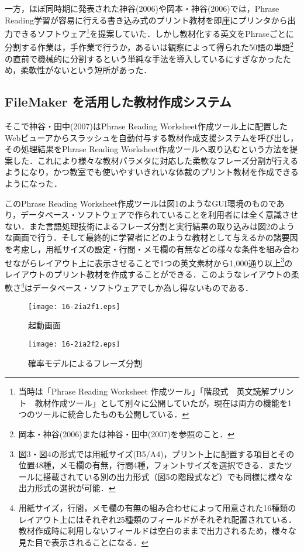 \documentclass[japanese]{jnlp_1.4}
\begin{document}
一方，ほぼ同時期に発表された神谷(2006)や岡本・神谷(2006)では，Phrase Reading学習が容易に行える書き込み式のプリント教材を即座にプリンタから出力できるソフトウェア\footnote{当時は「Phrase Reading Worksheet 作成ツール」「階段式　英文読解プリント　教材作成ツール」として別々に公開していたが，現在は両方の機能を1つのツールに統合したものも公開している．}を提案していた．しかし教材化する英文をPhraseごとに分割する作業は，手作業で行うか，あるいは観察によって得られた50語の単語\footnote{岡本・神谷(2006)または神谷・田中(2007)を参照のこと．}の直前で機械的に分割するという単純な手法を導入しているにすぎなかったため，柔軟性がないという短所があった．


\subsection{FileMaker を活用した教材作成システム}

そこで神谷・田中(2007)はPhrase Reading Worksheet作成ツール上に配置したWebビューアからスラッシュを自動付与する教材作成支援システムを呼び出し，その処理結果をPhrase Reading Worksheet作成ツールへ取り込むという方法を提案した．これにより様々な教材パラメタに対応した柔軟なフレーズ分割が行えるようになり，かつ教室でも使いやすいきれいな体裁のプリント教材を作成できるようになった．

このPhrase Reading Worksheet作成ツールは図1のようなGUI環境のものであり，データベース・ソフトウェアで作られていることを利用者には全く意識させない．また言語処理技術によるフレーズ分割と実行結果の取り込みは図2のような画面で行う．そして最終的に学習者にどのような教材として与えるかの諸要因を考慮し，用紙サイズの設定・行間・メモ欄の有無などの様々な条件を組み合わせながらレイアウト上に表示させることで1つの英文素材から1,000通り以上\footnote{図3・図4の形式では用紙サイズ(B5/A4)，プリント上に配置する項目とその位置48種，メモ欄の有無，行間4種，フォントサイズを選択できる．またツールに搭載されている別の出力形式（図5の階段式など）でも同様に様々な出力形式の選択が可能．}のレイアウトのプリント教材を作成することができる．このようなレイアウトの柔軟さ\footnote{用紙サイズ，行間，メモ欄の有無の組み合わせによって用意された16種類のレイアウト上にはそれぞれ25種類のフィールドがそれぞれ配置されている．教材作成時に利用しないフィールドは空白のままで出力されるため，様々な見た目で表示されることになる．}はデータベース・ソフトウェアでしか為し得ないものである．

\begin{figure}[t]
 \begin{minipage}[b]{201pt}
  \begin{center}
    \texttt{[image: 16-2ia2f1.eps]}
  \end{center}
  \caption{起動画面}
 \end{minipage}
\hfill
 \begin{minipage}[b]{201pt}
   \begin{center}
     \texttt{[image: 16-2ia2f2.eps]}
   \end{center}
   \caption{確率モデルによるフレーズ分割}
 \end{minipage}
\end{figure}
\end{document}
